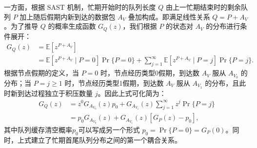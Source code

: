 一方面，根据 SAST 机制，忙期开始时的队列长度 $Q$ 由上一忙期结束时的剩余队列 $P$ 加上随后假期内新到达的数据包 $A_V$ 叠加构成。即满足线性关系 $Q = P + A_V$。为了推导 $Q$ 的概率生成函数 $G_Q(z)$，我们根据 $P$ 的状态对 $A_V$ 的分布进行条件展开：
\begin{equation}
	\begin{aligned}
		G_Q(z) &= \mathbb{E}\left[ z^{P + A_V} \right] \\
		&= \mathbb{E}\left[ z^{P + A_V} \mid P = 0 \right] \Pr\{P = 0\} + \sum_{j=1}^{\infty} \mathbb{E}\left[ z^{P + A_V} \mid P = j \right] \Pr\{P = j\}.
	\end{aligned}
\end{equation}
根据节点假期的定义，当 $P=0$ 时，节点经历类型0假期，到达数 $A_V$ 服从 $A_{V_0}$ 的分布；当 $P=j \ge 1$ 时，节点经历类型1假期，到达数 $A_V$ 服从 $A_{V_1}$ 的分布，且此时新到达过程独立于积压数量 $j$。因此上式可化简为：
\begin{equation}
	\begin{aligned}
		G_Q(z) &= z^0 G_{A_{V_0}}(z) p_0 + G_{A_{V_1}}(z) \sum_{j=1}^{\infty} z^j \Pr\{P = j\} \\
		&= p_0 G_{A_{V_0}}(z) + G_{A_{V_1}}(z) \left[ G_P(z) - p_0 \right],
	\end{aligned}
	\label{eq:GQ_GP_relation}
\end{equation}
其中队列缓存清空概率$ p_0 $可以写成另一个形式 $p_0 = \Pr\{P=0\} = G_P(0)$。同时，上式建立了忙期首尾队列分布之间的第一个耦合关系。



